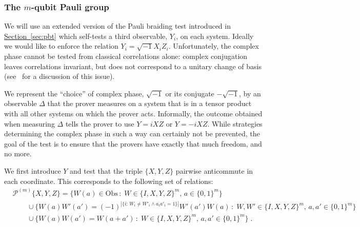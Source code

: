\documentclass[11pt]{article}
\numberwithin{equation}{section}
\theoremstyle{definition}
\theoremstyle{plain}
\newcommand{\expref}[2]{\hyperref[#2]{#1~\ref{#2}}}
\newcommand{\setft}[1]{\mathrm{#1}}
\newcommand{\Obs}{\setft{Obs}}
\newcommand{\paulin}{\mathcal{P}^{(m)}\!}
\begin{document}
%
%

\subsubsection{The \texorpdfstring{$m$}{m}-qubit Pauli group}
\label{sec:e-pbt}


We will use an extended version of the Pauli braiding test introduced in \expref{Section}{sec:pbt} which self-tests a third observable, $Y_i$, on each system. Ideally we would like to enforce the relation $Y_i=\sqrt{-1}X_iZ_i$. Unfortunately, the complex phase cannot be tested from classical correlations alone: complex conjugation leaves correlations invariant, but does not correspond to a unitary change of basis  (see~\cite[Appendix A]{reichardt2012classicalarxiv} for a discussion of this issue). 

We represent the ``choice'' of complex phase, $\sqrt{-1}$ or its conjugate $-\sqrt{-1}$, by an observable $\Delta$ that the prover measures on a system that is in a tensor product with all other systems on which the prover acts. Informally, the outcome obtained when measuring $\Delta$ tells the prover to use $Y = i XZ$ or $Y=-iXZ$. While strategies determining the complex phase in such a way can certainly not be prevented, the goal of the test is to ensure that the provers have exactly that much freedom, and no more. 

We first introduce $Y$ and test that the triple $\{X,Y,Z\}$ pairwise anticommute in each coordinate. This corresponds to the following set of relations: 
\begin{align*}
& {\paulin}\{X,Y,Z\} = \Big\{ W(a)\in\Obs\,:\;W \in \{I,X,Y,Z\}^m,\,a\in\{0,1\}^m\Big\} \\
&\qquad\cup \Big\{W(a)W'(a')=(-1)^{|\{i:\,W_i\neq W'_i \wedge a_ia'_i=1\}|} W'(a')W(a)\,:\;W,W' \in \{I,X,Y,Z\}^m,\,a,a'\in\{0,1\}^m\Big\}\\
&\qquad \cup\Big\{ W(a)W(a')=W(a+a')\,:\;W \in \{I,X,Y,Z\}^m,\,a,a'\in\{0,1\}^m\Big\}\;.
\end{align*}
\end{document}
